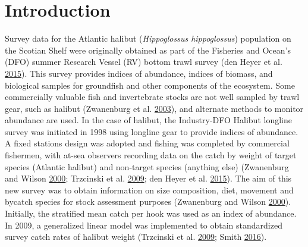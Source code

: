 \documentclass[12pt]{article}\usepackage[]{graphicx}\usepackage[]{color}
\begin{document}

\frontmatter


\renewcommand{\headrulewidth}{0.5pt}  %
\renewcommand{\footrulewidth}{0.5pt}  %

\newcommand{\lt}{\ensuremath <}
\newcommand{\gt}{\ensuremath >}


\hypertarget{sec:introduction}{%
\section{Introduction}\label{sec:introduction}}

Survey data for the Atlantic halibut (\emph{Hippoglossus hippoglossus}) population on the Scotian Shelf were originally obtained as part of the Fisheries and Ocean's (DFO) summer Research Vessel (RV) bottom trawl survey (den Heyer et al. \protect\hyperlink{ref-DenHeyer2015}{2015}). This survey provides indices of abundance, indices of biomass, and biological samples for groundfish and other components of the ecosystem. Some commercially valuable fish and invertebrate stocks are not well sampled by trawl gear, such as halibut (Zwanenburg et al. \protect\hyperlink{ref-Zwanenburg2003}{2003}), and alternate methods to monitor abundance are used. In the case of halibut, the Industry-DFO Halibut longline survey was initiated in 1998 using longline gear to provide indices of abundance. A fixed stations design was adopted and fishing was completed by commercial fishermen, with at-sea observers recording data on the catch by weight of target species (Atlantic halibut) and non-target species (anything else) (Zwanenburg and Wilson \protect\hyperlink{ref-Zwanenburg2000}{2000}; Trzcinski et al. \protect\hyperlink{ref-Trzcinski2009}{2009}; den Heyer et al. \protect\hyperlink{ref-DenHeyer2015}{2015}). The aim of this new survey was to obtain information on size composition, diet, movement and bycatch species for stock assessment purposes (Zwanenburg and Wilson \protect\hyperlink{ref-Zwanenburg2000}{2000}). Initially, the stratified mean catch per hook was used as an index of abundance. In 2009, a generalized linear model was implemented to obtain standardized survey catch rates of halibut weight (Trzcinski et al. \protect\hyperlink{ref-Trzcinski2009}{2009}; Smith \protect\hyperlink{ref-Smith2016a}{2016}).
\end{document}
